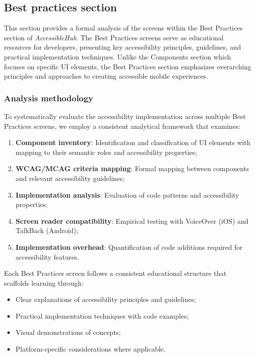 \subsection{Best practices section}
\label{subsec:best-practices-section}

This section provides a formal analysis of the screens within the Best Practices section of \textit{AccessibleHub}. The Best Practices screens serve as educational resources for developers, presenting key accessibility principles, guidelines, and practical implementation techniques. Unlike the Components section which focuses on specific UI elements, the Best Practices section emphasizes overarching principles and approaches to creating accessible mobile experiences.

\subsubsection{Analysis methodology}
\label{subsubsec:bp-methodology}

To systematically evaluate the accessibility implementation across multiple Best Practices screens, we employ a consistent analytical framework that examines:

\begin{enumerate}
    \item \textbf{Component inventory}: Identification and classification of UI elements with mapping to their semantic roles and accessibility properties;
    
    \item \textbf{WCAG/MCAG criteria mapping}: Formal mapping between components and relevant accessibility guidelines;
    
    \item \textbf{Implementation analysis}: Evaluation of code patterns and accessibility properties;
    
    \item \textbf{Screen reader compatibility}: Empirical testing with VoiceOver (iOS) and TalkBack (Android);
    
    \item \textbf{Implementation overhead}: Quantification of code additions required for accessibility features.
\end{enumerate}

Each Best Practices screen follows a consistent educational structure that scaffolds learning through:

\begin{itemize}
    \item Clear explanations of accessibility principles and guidelines;
    \item Practical implementation techniques with code examples;
    \item Visual demonstrations of concepts;
    \item Platform-specific considerations where applicable.
\end{itemize}

